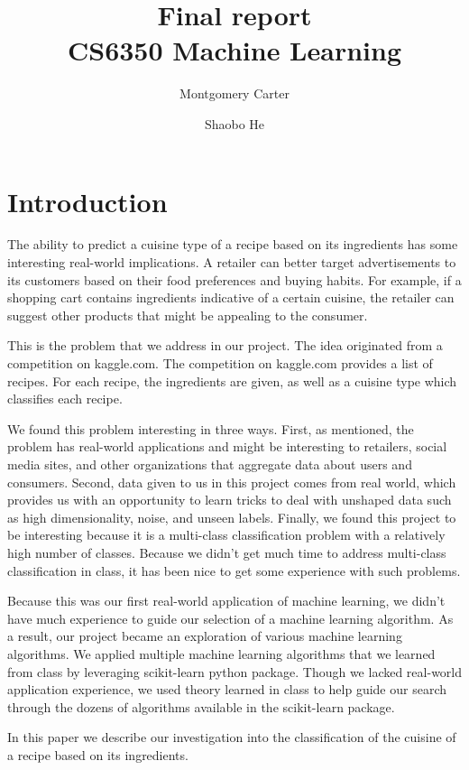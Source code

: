 \documentclass[11pt]{article}
\title{Final report\\CS6350 Machine Learning}
\author{Montgomery Carter \and Shaobo He}
\begin{document}
\maketitle

\section{Introduction}
The ability to predict a cuisine type of a recipe based on its
ingredients has some interesting real-world implications.  A retailer
can better target advertisements to its customers based on their food
preferences and buying habits.  For example, if a shopping cart
contains ingredients indicative of a certain cuisine, the retailer can
suggest other products that might be appealing to the consumer.

This is the problem that we address in our project.  The idea
originated from a competition on kaggle.com\cite{kaggle-link}. The
competition on  kaggle.com provides a list of recipes.  For each
recipe, the ingredients are given, as well as a cuisine type which
classifies each recipe.

We found this problem interesting in three ways. First, as mentioned,
the problem has real-world applications and might be interesting to
retailers, social media sites, and other organizations that aggregate
data about users and consumers.  Second, data given to us in this
project comes from real world, which provides us with an opportunity
to learn tricks to deal with unshaped data such as high
dimensionality, noise, and unseen labels.  Finally, we found this 
project to be interesting because it is a multi-class classification
problem with a relatively high number of classes.  Because we didn't
get much time to address multi-class classification in class, it has
been nice to get some experience with such problems.

Because this was our first real-world application of machine learning,
we didn't have much experience to guide our selection of a machine
learning algorithm.  As a result, our project became an exploration of
various machine learning algorithms.  We applied multiple machine
learning algorithms that we learned from class by leveraging
scikit-learn python package. Though we lacked real-world application
experience, we used theory learned in class to help guide our search
through the dozens of algorithms available in the scikit-learn
package.

In this paper we describe our investigation into the classification of
the cuisine of a recipe based on its ingredients.
\end{document}
